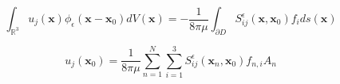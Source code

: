 \begin{equation}
    \int_{\mathbb{R}^{3}} u_{j}(\mathbf{x}) \phi_{\epsilon}\left(\mathbf{x}-\mathbf{x}_{0}\right) d V(\mathbf{x})=-\frac{1}{8 \pi \mu} \int_{\partial D} S_{i j}^{\epsilon}\left(\mathbf{x}, \mathbf{x}_{0}\right) f_{i} d s(\mathbf{x})
\end{equation}


\begin{equation}
\label{eq:Stokesletsum}
    u_{j}\left(\mathbf{x}_{0}\right)=\frac{1}{8 \pi \mu} \sum_{n=1}^{N} \sum_{i=1}^{3} S_{i j}^{\epsilon}\left(\mathbf{x}_{n}, \mathbf{x}_{0}\right) f_{n, i} A_{n}
\end{equation}
